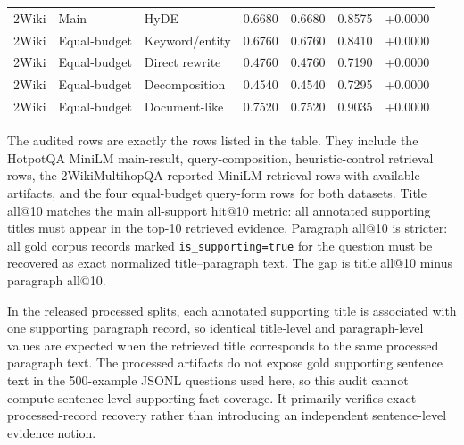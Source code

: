 \begin{table}[t]
\begin{threeparttable}
\begin{tabularx}{\textwidth}{>{\raggedright\arraybackslash}p{} l >{\raggedright\arraybackslash}X r r r r}
2Wiki & Main & HyDE & 0.6680 & 0.6680 & 0.8575 & +0.0000 \\
2Wiki & Equal-budget & Keyword/entity & 0.6760 & 0.6760 & 0.8410 & +0.0000 \\
2Wiki & Equal-budget & Direct rewrite & 0.4760 & 0.4760 & 0.7190 & +0.0000 \\
2Wiki & Equal-budget & Decomposition & 0.4540 & 0.4540 & 0.7295 & +0.0000 \\
2Wiki & Equal-budget & Document-like & 0.7520 & 0.7520 & 0.9035 & +0.0000 \\
\bottomrule
\end{tabularx}
\begin{tablenotes}
\footnotesize
\item The audited rows are exactly the rows listed in the table. They include the HotpotQA MiniLM main-result, query-composition, heuristic-control retrieval rows, the 2WikiMultihopQA reported MiniLM retrieval rows with available artifacts, and the four equal-budget query-form rows for both datasets. Title all@10 matches the main all-support hit@10 metric: all annotated supporting titles must appear in the top-10 retrieved evidence. Paragraph all@10 is stricter: all gold corpus records marked \texttt{is\_supporting=true} for the question must be recovered as exact normalized title--paragraph text. The gap is title all@10 minus paragraph all@10.
\item In the released processed splits, each annotated supporting title is associated with one supporting paragraph record, so identical title-level and paragraph-level values are expected when the retrieved title corresponds to the same processed paragraph text. The processed artifacts do not expose gold supporting sentence text in the 500-example JSONL questions used here, so this audit cannot compute sentence-level supporting-fact coverage. It primarily verifies exact processed-record recovery rather than introducing an independent sentence-level evidence notion.
\end{tablenotes}
\end{threeparttable}
\end{table}
